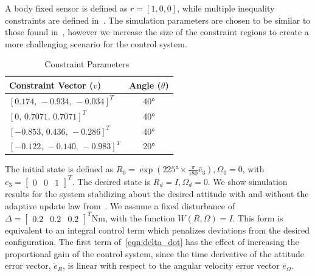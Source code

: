 A body fixed sensor is defined as \(r = [1,0,0]\), while multiple inequality constraints are defined in~.
The simulation parameters are chosen to be similar to those found in~\cite{lee2011b}, however we increase the size of the constraint regions to create a more challenging scenario for the control system.
\begin{table}[htbp]
    \centering
\begin{tabular}{lc}
    \toprule
Constraint Vector (\( v \)) & Angle (\( \theta \)) \\ 
\midrule
\([0.174,\,-0.934,\, -0.034]^T\) & \ang{40} \\ 
\([0 ,\, 0.7071 ,\, 0.7071]^T\) & \ang{40} \\ 
\([-0.853 ,\, 0.436 ,\, -0.286]^T\) & \ang{40} \\ 
\([-0.122 ,\,-0.140,\, -0.983]^T\) & \ang{20} \\
\bottomrule
\end{tabular} 
\caption{Constraint Parameters~\label{tab:constraints}}
\end{table}
The initial state is defined as \(R_0 =  \exp(\ang{225} \times \frac{\pi}{180} \hat{e}_3), \Omega_0 = 0\), with \( e_3 = \begin{bmatrix} 0 & 0 & 1 \end{bmatrix}^T \).
The desired state is \( R_d = I,\Omega_d = 0\).
We show simulation results for the system stabilizing about the desired attitude with and without the adaptive update law from~.
We assume a fixed disturbance of \(\Delta = \begin{bmatrix} 0.2 & 0.2 & 0.2 \end{bmatrix}^T \si{\newton\meter}\), with the function \( W(R,\Omega) = I \).
This form is equivalent to an integral control term which penalizes deviations from the desired configuration.
The first term of~\cref{eqn:delta_dot} has the effect of increasing the proportional gain of the control system, since the time derivative of the attitude error vector, \( \dot{e}_{R} \), is linear with respect to the angular velocity error vector \( e_\Omega\).

